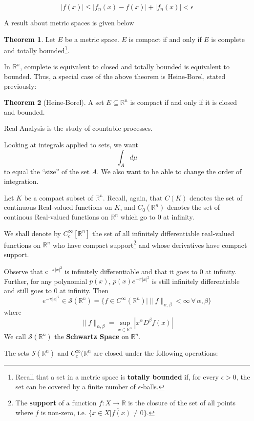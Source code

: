 \documentclass[12pt,leqno]{article}
\numberwithin{equation}{section}
\theoremstyle{definition}
\newtheorem*{Thm}{Theorem}
\begin{document}
\[|f(x)|\leq|f_n(x)-f(x)|+|f_n(x)|<\epsilon\]

A result about metric spaces is given below

\begin{Thm}
 Let $E$ be a metric space. $E$ is compact if and only if $E$ is complete and totally bounded\footnote{Recall that a set in a metric space is \textbf{totally bounded} if, for every $\epsilon>0$, the set can be covered by a finite number of $\epsilon$-balls.}.
\end{Thm}

In $\mathbb{R}^n$, complete is equivalent to closed and totally bounded is equivalent to bounded. Thus, a special case of the above theorem is Heine-Borel, stated previously:

\begin{Thm}[Heine-Borel]
 A set $E\subseteq\mathbb{R}^n$ is compact if and only if it is closed and bounded.
\end{Thm}

Real Analysis is the study of countable processes. 

Looking at integrals applied to sets, we want \[\int_Ad\mu\] to equal the ``size'' of the set $A$. We also want to be able to change the order of integration.

Let $K$ be a compact subset of $\mathbb{R}^n$. Recall, again, that $C(K)$ denotes the set of continuous Real-valued functions on $K$, and $C_0(\mathbb{R}^n)$ denotes the set of continous Real-valued functions on $\mathbb{R}^n$ which go to $0$ at infinity.

We shall denote by $C_c^{\infty}[\mathbb{R}^n]$ the set of all infinitely differentiable real-valued functions on $\mathbb{R}^n$ who have compact support\footnote{The \textbf{support} of a function $f:X\to\mathbb{R}$ is the closure of the set of all points where $f$ is non-zero, i.e. $\overline{\{x\in X|f(x)\not=0\}}$.} and whose derivatives have compact support. 

Observe that $e^{-\pi|x|^2}$ is infinitely differentiable and that it goes to 0 at infinity. Further, for any polynomial $p(x)$, $p(x)e^{-\pi|x|^2}$ is still infinitely differentiable and still goes to 0 at infinity. Then \[e^{-\pi|x|^2}\in\mathcal{S} \left(\mathbb{R}^n\right)=\{f\in C^\infty(\mathbb{R}^n)\mid\|f\|_{\alpha,\beta}<\infty\,\forall\,\alpha,\beta\}\] where 
\[\|f\|_{\alpha,\beta}=\sup_{x\in\mathbb{R}^n}|x^\alpha D^\beta f(x)|\] We call $\mathcal{S}(\mathbb{R}^n)$ the \textbf{Schwartz Space} on $\mathbb{R}^n$.

The sets $\mathcal{S}(\mathbb{R}^n)$ and $C_c^{\infty}(\mathbb{R}^n$ are closed under the following operations:
\end{document}
